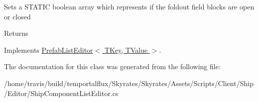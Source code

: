 Sets a S\-T\-A\-T\-I\-C boolean array which represents if the foldout field blocks are open or closed 

\begin{DoxyReturn}{Returns}

\end{DoxyReturn}


Implements \hyperlink{class_prefab_list_editor_3_01_t_key_00_01_t_value_01_4_a7854686cfcba09b2c55ace182e38eddf}{Prefab\-List\-Editor$<$ T\-Key, T\-Value $>$}.



The documentation for this class was generated from the following file\-:\begin{DoxyCompactItemize}
\item 
/home/travis/build/temportalflux/\-Skyrates/\-Skyrates/\-Assets/\-Scripts/\-Client/\-Ship/\-Editor/Ship\-Component\-List\-Editor.\-cs\end{DoxyCompactItemize}
